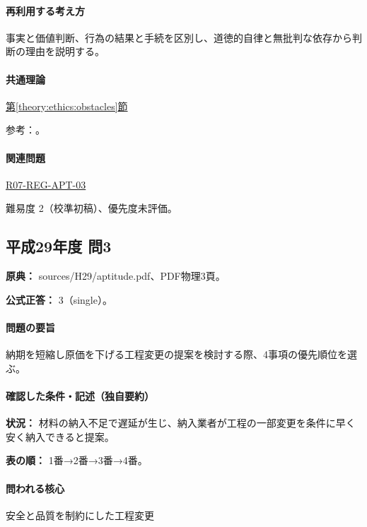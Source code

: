 \paragraph{再利用する考え方} 事実と価値判断、行為の結果と手続を区別し、道徳的自律と無批判な依存から判断の理由を説明する。

\paragraph{共通理論} \hyperref[theory:ethics:obstacles]{第\ref*{theory:ethics:obstacles}節}

\par 参考：\cite{davis_seven_steps}。

\paragraph{関連問題} \hyperref[q:r07-reg-apt-03]{R07-REG-APT-03}

\par 難易度 2（校準初稿）、優先度未評価。

\subsection{平成29年度 問3}
\label{q:h29-reg-apt-03}

\noindent\textbf{原典：} sources/H29/aptitude.pdf、PDF物理3頁。

\textbf{公式正答：} 3（single）。

\paragraph{問題の要旨} 納期を短縮し原価を下げる工程変更の提案を検討する際、4事項の優先順位を選ぶ。

\paragraph{確認した条件・記述（独自要約）}\mbox{}\par

\noindent\textbf{状況：} 材料の納入不足で遅延が生じ、納入業者が工程の一部変更を条件に早く安く納入できると提案。\par

\noindent\textbf{表の順：} 1番→2番→3番→4番。\par

\paragraph{問われる核心} 安全と品質を制約にした工程変更

